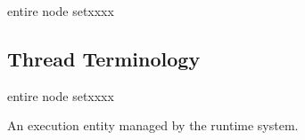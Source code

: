 \begin{namelist}{entire node setxxxx}
%
%
%
%
%

\end{namelist}

\subsection{Thread Terminology}

\begin{namelist}{entire node setxxxx}


  An execution entity managed by the {\XMP} runtime system.

\end{namelist}


